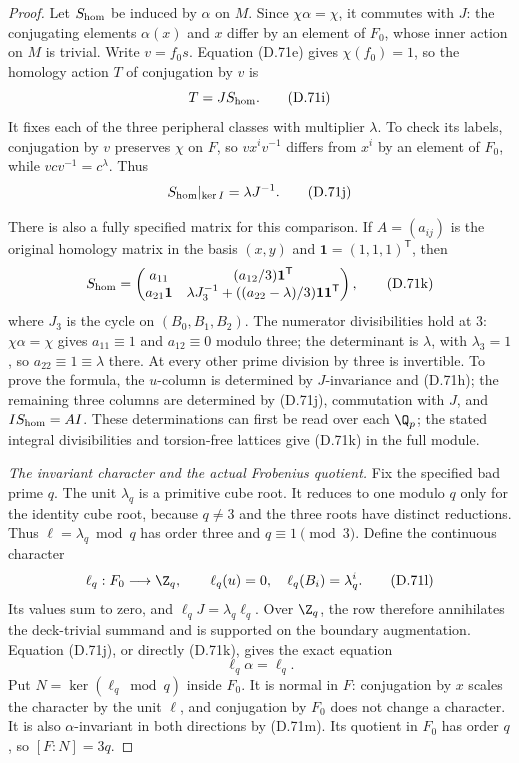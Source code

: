 \begin{proof}
Let $S_{\rm hom}$ be induced by $\alpha$ on $M$.
Since $\chi\alpha=\chi$, it commutes with $J$:
the conjugating elements $\alpha(x)$ and $x$
differ by an element of $F_0$, whose inner
action on $M$ is trivial.
Write $v=f_0s$. Equation (D.71e) gives
$\chi(f_0)=1$, so the homology action $T$ of
conjugation by $v$ is
\[
                              T=JS_{\rm hom}.                \tag{D.71i}
\]
It fixes each of the three peripheral classes
with multiplier $\lambda$.
To check its labels, conjugation by $v$ preserves
$\chi$ on $F$, so $vx^iv^{-1}$ differs from
$x^i$ by an element of $F_0$, while
$vcv^{-1}=c^\lambda$.
Thus
\[
       S_{\rm hom}|_{\ker I}=\lambda J^{-1}.
                                                               \tag{D.71j}
\]

There is also a fully specified matrix for this
comparison. If $A=(a_{ij})$ is the original
homology matrix in the basis $(x,y)$ and
$\boldsymbol1=(1,1,1)^{\mathsf T}$, then
\[
 S_{\rm hom}=
 \begin{pmatrix}
 a_{11}&(a_{12}/3)\boldsymbol1^{\mathsf T}\\
 a_{21}\boldsymbol1&
       \lambda J_3^{-1}
          +((a_{22}-\lambda)/3)\boldsymbol1\boldsymbol1^{\mathsf T}
 \end{pmatrix},
                                                               \tag{D.71k}
\]
where $J_3$ is the cycle on $(B_0,B_1,B_2)$.
The numerator divisibilities hold at $3$:
$\chi\alpha=\chi$ gives $a_{11}\equiv1$ and
$a_{12}\equiv0$ modulo three; the determinant
is $\lambda$, with $\lambda_3=1$, so
$a_{22}\equiv1\equiv\lambda$ there.
At every other prime division by three is
invertible. To prove the formula, the $u$-column
is determined by $J$-invariance and (D.71h);
the remaining three columns are determined by
(D.71j), commutation with $J$, and
$IS_{\rm hom}=AI$.
These determinations can first be read over each
$\Q_p$; the stated integral divisibilities
and torsion-free lattices give (D.71k) in
the full module.

\emph{The invariant character and the actual Frobenius quotient.}
Fix the specified bad prime $q$.
The unit $\lambda_q$ is a primitive cube root.
It reduces to one modulo $q$ only for the
identity cube root, because $q\ne3$ and the
three roots have distinct reductions.
Thus $\ell=\lambda_q\bmod q$ has order three
and $q\equiv1\pmod3$.
Define the continuous character
\[
 \ell_q:F_0\longrightarrow\Z_q,\qquad
           \ell_q(u)=0,\quad
           \ell_q(B_i)=\lambda_q^i .
                                                               \tag{D.71l}
\]
Its values sum to zero, and
$\ell_qJ=\lambda_q\ell_q$.
Over $\Z_q$, the row therefore annihilates the
deck-trivial summand and is supported on the
boundary augmentation. Equation (D.71j), or directly
(D.71k), gives the exact equation
\[
                             \ell_q\alpha=\ell_q.             \tag{D.71m}
\]
Put $N=\ker(\ell_q\bmod q)$ inside $F_0$.
It is normal in $F$: conjugation by $x$ scales
the character by the unit $\ell$, and
conjugation by $F_0$ does not change a character.
It is also $\alpha$-invariant in both directions
by (D.71m).
Its quotient in $F_0$ has order $q$, so
$[F:N]=3q$.


\end{proof}
